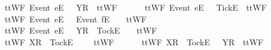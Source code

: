 \ \ {\isachardoublequoteopen}ttWF{}\ {\isacharparenleft}{\isacharbrackleft}Event\ e{\isacharbrackright}\isactrlsub E\ {\isacharhash}\ {\isasymsigma}{\isacharparenright}\ {\isacharbrackleft}{\isacharbrackleft}Y{\isacharbrackright}\isactrlsub R{\isacharbrackright}\ {\isacharequal}\ ttWF{}\ {\isasymsigma}\ {\isacharbrackleft}{\isacharbrackright}{\isachardoublequoteclose}\ {\isacharbar}\ \isanewline
\ \ {\isachardoublequoteopen}ttWF{}\ {\isacharparenleft}{\isacharbrackleft}Event\ e{\isacharbrackright}\isactrlsub E\ {\isacharhash}\ {\isasymsigma}{\isacharparenright}\ {\isacharbrackleft}{\isacharbrackleft}Tick{\isacharbrackright}\isactrlsub E{\isacharbrackright}\ {\isacharequal}\ ttWF{}\ {\isasymsigma}\ {\isacharbrackleft}{\isacharbrackright}{\isachardoublequoteclose}\ {\isacharbar}\ \isanewline
\ \ {\isachardoublequoteopen}ttWF{}\ {\isacharparenleft}{\isacharbrackleft}Event\ e{\isacharbrackright}\isactrlsub E\ {\isacharhash}\ {\isasymrho}{\isacharparenright}\ {\isacharparenleft}{\isacharbrackleft}Event\ f{\isacharbrackright}\isactrlsub E\ {\isacharhash}\ {\isasymsigma}{\isacharparenright}\ {\isacharequal}\ ttWF{}\ {\isasymrho}\ {\isasymsigma}{\isachardoublequoteclose}\ {\isacharbar}\ \isanewline
\ \ {\isachardoublequoteopen}ttWF{}\ {\isacharparenleft}{\isacharbrackleft}Event\ e{\isacharbrackright}\isactrlsub E\ {\isacharhash}\ {\isasymrho}{\isacharparenright}\ {\isacharparenleft}{\isacharbrackleft}Y{\isacharbrackright}\isactrlsub R\ {\isacharhash}\ {\isacharbrackleft}Tock{\isacharbrackright}\isactrlsub E\ {\isacharhash}\ {\isasymsigma}{\isacharparenright}\ {\isacharequal}\ ttWF{}\ {\isasymrho}\ {\isasymsigma}{\isachardoublequoteclose}\ {\isacharbar}\ \isanewline
\ \ {\isachardoublequoteopen}ttWF{}\ {\isacharparenleft}{\isacharbrackleft}X{\isacharbrackright}\isactrlsub R\ {\isacharhash}\ {\isacharbrackleft}Tock{\isacharbrackright}\isactrlsub E\ {\isacharhash}\ {\isasymsigma}{\isacharparenright}\ {\isacharbrackleft}{\isacharbrackright}\ {\isacharequal}\ ttWF{}\ {\isasymsigma}\ {\isacharbrackleft}{\isacharbrackright}{\isachardoublequoteclose}\ {\isacharbar}\ \isanewline
\ \ {\isachardoublequoteopen}ttWF{}\ {\isacharparenleft}{\isacharbrackleft}X{\isacharbrackright}\isactrlsub R\ {\isacharhash}\ {\isacharbrackleft}Tock{\isacharbrackright}\isactrlsub E\ {\isacharhash}\ {\isasymsigma}{\isacharparenright}\ {\isacharbrackleft}{\isacharbrackleft}Y{\isacharbrackright}\isactrlsub R{\isacharbrackright}\ {\isacharequal}\ ttWF{}\ {\isasymsigma}\ {\isacharbrackleft}{\isacharbrackright}{\isachardoublequoteclose}\ {\isacharbar}\ \isanewline
